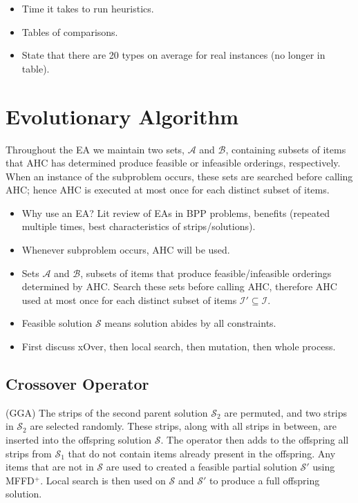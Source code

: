 \documentclass{elsarticle}
\begin{document}
\begin{itemize}
	\item Time it takes to run heuristics.
	\item Tables of comparisons.
	\item State that there are 20 types on average for real instances (no longer in table).
\end{itemize}


\section{Evolutionary Algorithm}
\label{sec:ea}
Throughout the EA we maintain two sets, $\mathcal{A}$ and $\mathcal{B}$, containing subsets of items that AHC has determined produce feasible or infeasible orderings, respectively. When an instance of the subproblem occurs, these sets are searched before calling AHC; hence AHC is executed at most once for each distinct subset of items.

\begin{itemize}
	\item Why use an EA? Lit review of EAs in BPP problems, benefits (repeated multiple times, best characteristics of strips/solutions).
	\item Whenever subproblem occurs, AHC will be used.
	\item Sets $\mathcal{A}$ and $\mathcal{B}$, subsets of items that produce feasible/infeasible orderings determined by AHC. Search these sets before calling AHC, therefore AHC used at most once for each distinct subset of items $\mathcal{I}' \subseteq \mathcal{I}$.
	\item Feasible solution $\mathcal{S}$ means solution abides by all constraints.
	\item First discuss xOver, then local search, then mutation, then whole process.
\end{itemize}


\subsection{Crossover Operator}
\label{sub:xover}
(GGA) The strips of the second parent solution $\mathcal{S}_2$ are permuted, and two strips in $\mathcal{S}_2$ are selected randomly. These strips, along with all strips in between, are inserted into the offspring solution $\mathcal{S}$. The operator then adds to the offspring all strips from $\mathcal{S}_1$ that do not contain items already present in the offspring. Any items that are not in $\mathcal{S}$ are used to created a feasible partial solution $\mathcal{S}'$ using MFFD$^+$. Local search is then used on $\mathcal{S}$ and $\mathcal{S}'$ to produce a full offspring solution.
\end{document}
